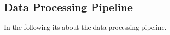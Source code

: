 \subsection{Data Processing Pipeline}
\label{subsec:pipeline}
In the following its about the data processing pipeline.





